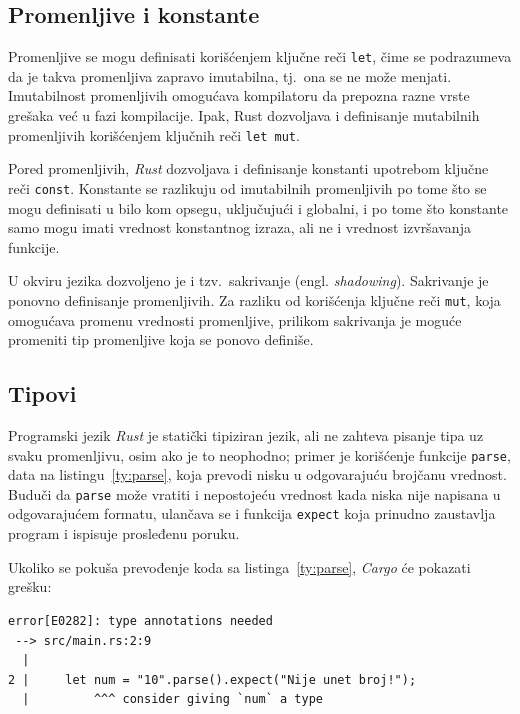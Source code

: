 \documentclass[12pt,oneside]{memoir}
\begin{document}
\subsection{Promenljive i konstante}
Promenljive se mogu definisati korišćenjem ključne reči \texttt{let}, čime se podrazumeva da
je takva promenljiva zapravo imutabilna, tj.\ ona se ne može menjati. Imutabilnost
promenljivih omogućava kompilatoru da prepozna razne vrste grešaka već u fazi kompilacije.
Ipak, Rust dozvoljava i definisanje mutabilnih promenljivih korišćenjem ključnih reči \texttt{let mut}.

Pored promenljivih, \emph{Rust} dozvoljava i definisanje konstanti
upotrebom ključne reči \texttt{const}.
Konstante se razlikuju od imutabilnih promenljivih po tome što se
mogu definisati u bilo kom opsegu, uključujući i globalni, i po
tome što konstante samo mogu imati vrednost konstantnog izraza,
ali ne i vrednost izvršavanja funkcije.

U okviru jezika dozvoljeno je i tzv.\ sakrivanje (engl. \emph{shadowing}).
Sakrivanje je ponovno definisanje promenljivih. Za razliku od
korišćenja ključne reči \texttt{mut}, koja omogućava promenu vrednosti promenljive, prilikom sakrivanja je
moguće promeniti tip promenljive koja se ponovo definiše.

\subsection{Tipovi}
Programski jezik \emph{Rust} je statički tipiziran jezik, ali
ne zahteva pisanje tipa uz svaku promenljivu, osim ako je to
neophodno; primer je korišćenje funkcije \texttt{parse}, data na listingu~\ref{ty:parse},
koja prevodi nisku u odgovarajuću brojčanu vrednost. Buduči da
\texttt{parse} može vratiti i nepostojeću vrednost kada niska nije napisana
u odgovarajućem formatu, ulančava se i funkcija \texttt{expect} koja
prinudno zaustavlja program i ispisuje prosleđenu poruku.



\noindent
Ukoliko se pokuša prevođenje koda sa listinga~\ref{ty:parse}, \emph{Cargo} će
pokazati grešku:

\begin{lstlisting}[language={}, style=text]
error[E0282]: type annotations needed
 --> src/main.rs:2:9
  |
2 |     let num = "10".parse().expect("Nije unet broj!");
  |         ^^^ consider giving `num` a type
\end{lstlisting}
\end{document}

